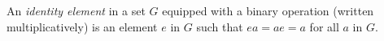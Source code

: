 An \textit{identity element} in a set $G$ equipped with a binary operation (written multiplicatively) is an element $e$ in $G$ such that $ea = ae = a$ for all $a$ in $G$.
